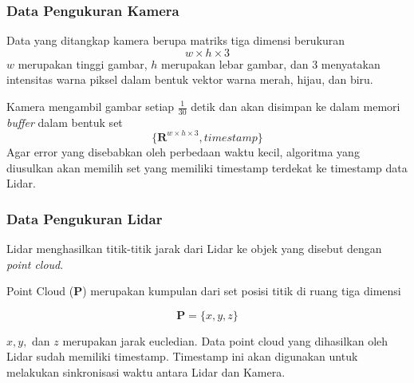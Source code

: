 \begin{frame}
    \frametitle{Data Pengukuran Kamera}

    Data yang ditangkap kamera berupa matriks tiga dimensi berukuran
    \begin{equation}
        w \times h \times 3
    \end{equation}
    $w$ merupakan tinggi gambar, $h$ merupakan lebar gambar, dan 3 menyatakan intensitas warna piksel dalam bentuk vektor warna merah, hijau, dan biru.

    Kamera mengambil gambar setiap $\frac{1}{30}$ detik dan akan disimpan ke dalam memori \textit{buffer} dalam bentuk set
    \begin{equation}
        \lbrace \mathbf{R}^{w \times h \times 3}, timestamp \rbrace
    \end{equation}
    Agar error yang disebabkan oleh perbedaan waktu kecil, algoritma yang diusulkan akan memilih set yang memiliki timestamp terdekat ke timestamp data Lidar.
\end{frame}


\begin{frame}
    \frametitle{Data Pengukuran Lidar}

    Lidar menghasilkan titik-titik jarak dari Lidar ke objek yang disebut dengan \textit{point cloud}.

    Point Cloud ($\mathbf{P}$) merupakan kumpulan dari set posisi titik di ruang tiga dimensi

    \begin{equation}
        \mathbf{P} = \lbrace x, y, z \rbrace
    \end{equation}

    $x, y,$ dan $z$ merupakan jarak eucledian. Data point cloud yang dihasilkan oleh Lidar sudah memiliki timestamp. Timestamp ini akan digunakan untuk melakukan sinkronisasi waktu antara Lidar dan Kamera.
\end{frame}


